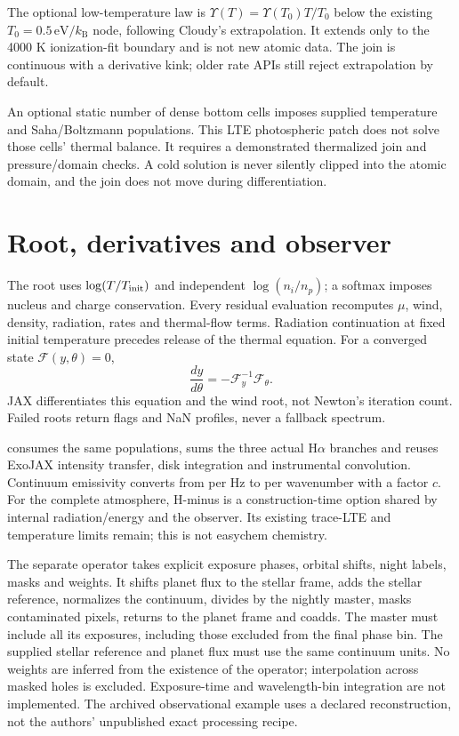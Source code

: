 \documentclass[10pt,a4paper]{article}
\newcommand{\kb}{k_{\mathrm B}}
\begin{document}
The optional low-temperature law is
$\Upsilon(T)=\Upsilon(T_0)T/T_0$ below the existing
$T_0=0.5\,\mathrm{eV}/\kb$ node, following Cloudy's extrapolation.
It extends only to the 4000 K ionization-fit boundary and is not new atomic
data. The join is continuous with a derivative kink; older rate APIs still
reject extrapolation by default.

An optional static number of dense bottom cells imposes supplied temperature
and Saha/Boltzmann populations. This LTE photospheric patch does not solve
those cells' thermal balance. It requires a demonstrated thermalized join
and pressure/domain checks. A cold solution is never silently clipped into
the atomic domain, and the join does not move during differentiation.

\section{Root, derivatives and observer}
The root uses $\log(T/T_{\rm init})$ and independent $\log(n_i/n_p)$;
a softmax imposes nucleus and charge conservation. Every residual evaluation
recomputes $\mu$, wind, density, radiation, rates and thermal-flow terms.
Radiation continuation at fixed initial temperature precedes release of
the thermal equation. For a converged state $\mathcal F(y,\theta)=0$,
\begin{equation}
 \frac{dy}{d\theta}=-\mathcal F_y^{-1}\mathcal F_\theta.
 \label{eq:ad}
\end{equation}
JAX differentiates this equation and the wind root, not Newton's iteration
count. Failed roots return flags and NaN profiles, never a fallback spectrum.

 consumes
the same populations, sums the three actual H$\alpha$ branches and reuses
ExoJAX intensity transfer, disk integration and instrumental convolution.
Continuum emissivity converts from per Hz to per wavenumber with a factor
$c$. For the complete atmosphere, H-minus is a construction-time option
shared by internal radiation/energy and the observer. Its existing trace-LTE
and temperature limits remain; this is not easychem chemistry.

The separate  operator takes explicit
exposure phases, orbital shifts, night labels, masks and weights. It shifts
planet flux to the stellar frame, adds the stellar reference, normalizes the
continuum, divides by the nightly master, masks contaminated pixels, returns
to the planet frame and coadds. The master must include all its exposures,
including those excluded from the final phase bin. The supplied stellar
reference and planet flux must use the same continuum units. No weights are
inferred from the existence of the operator; interpolation across masked
holes is excluded. Exposure-time and wavelength-bin integration are not
implemented. The archived observational example uses a declared reconstruction,
not the authors' unpublished exact processing recipe.
\end{document}
